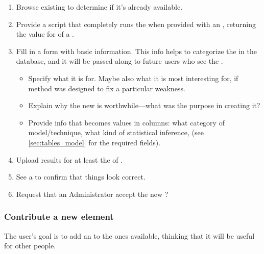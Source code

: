 \begin{enumerate}
    \item Browse existing \Methods to determine if it's already available.
    \item Provide a script that completely runs the \Method when provided with an \Element, returning the value for \Performance of a \Task.
    \item Fill in a form with basic information.
          This info helps to categorize the \Method in the database, and it will be passed along to future users who see the \Method.
        \begin{itemize}
            \item Specify what \Task it is for.
                  Maybe also what \Refset it is most interesting for, \eg if method was designed to fix a particular weakness.
            \item Explain why the new \Method is worthwhile---what was the purpose in creating it?
            \item Provide info that becomes values in columns: what category of model/technique, what kind of statistical inference, \etc (see \cref{sec:tables_model} for the required fields).
        \end{itemize}
    \item Upload \Performance results for at least the \Benchmark of \Elements.
    \item See a \Report to confirm that things look correct.
    \item Request that an Administrator accept the new \Method?
\end{enumerate}

\subsubsection{Contribute a new element}

The user's goal is to add an \Element to the ones available, thinking that it will be useful for other people.

